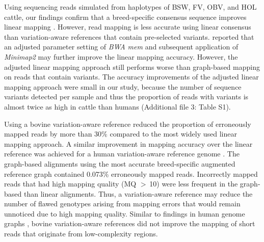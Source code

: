 \documentclass[../main.tex]{subfiles}
\begin{document}
Using sequencing reads simulated from haplotypes of BSW, FV, OBV, and HOL cattle, our findings confirm that a breed-specific consensus sequence improves linear mapping \citep{ballouz2019time,shukla2019hg19kindel}. However, read mapping is less accurate using linear consensus than variation-aware references that contain pre-selected variants. \citep{grytten2020assessing} reported that an adjusted parameter setting of \emph{BWA mem} and subsequent application of \emph{Minimap2} may further improve the linear mapping accuracy. However, the adjusted linear mapping approach still performs worse than graph-based mapping on reads that contain variants. The accuracy improvements of the adjusted linear mapping approach were small in our study, because the number of sequence variants detected per sample and thus the proportion of reads with variants is almost twice as high in cattle than humans (Additional file 3: Table S1).

Using a bovine variation-aware reference reduced the proportion of erroneously mapped reads by more than 30\% compared to the most widely used linear mapping approach. A similar improvement in mapping accuracy over the linear reference was achieved for a human variation-aware reference genome \citep{pritt2018forge}. The graph-based alignments using the most accurate breed-specific augmented reference graph contained 0.073\% erroneously mapped reads. Incorrectly mapped reads that had high mapping quality (MQ $>$ 10) were less frequent in the graph-based than linear alignments. Thus, a variation-aware reference may reduce the number of flawed genotypes arising from mapping errors that would remain unnoticed due to high mapping quality. Similar to findings in human genome graphs \citep{pritt2018forge,hickey2020genotyping}, bovine variation-aware references did not improve the mapping of short reads that originate from low-complexity regions.
\end{document}
